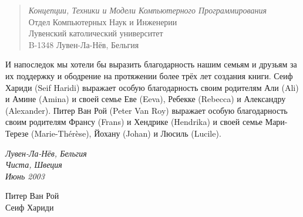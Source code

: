 \begin{quote}
\emph{Концепции, Техники и Модели Компьютерного Программирования} \\ Отдел Компьютерных Наук и Инженерии \\ Лувенский католический университет \\ B-1348 Лувен-Ла-Нёв, Бельгия
\end{quote}

И напоследок мы хотели бы выразить благодарность нашим семьям и друзьям за их поддержку и ободрение на протяжении более трёх лет создания книги. Сеиф Хариди (Seif Haridi) выражает особую благодарность своим родителям Али (Ali) и Амине (Amina) и своей семье Еве (Eeva), Ребекке (Rebecca) и Александру (Alexander). Питер Ван Рой (Peter Van Roy) выражает особую благодарность своим родителям Франсу (Frans) и Хендрике (Hendrika) и своей семье Мари-Терезе (Marie-Th{\'e}r{\`e}se), Йохану (Johan) и Люсиль (Lucile).

\hfill

\begin{minipage}{0.5\textwidth}
  \begin{flushleft}
\emph{Лувен-Ла-Нёв, Бельгия} \\ \emph{Чиста, Швеция} \\ \emph{Июнь 2003}
  \end{flushleft}
\end{minipage}
\begin{minipage}{0.4\textwidth}
  \begin{flushright}
{\large Питер Ван Рой} \\ {\large Сеиф Хариди}
  \end{flushright}
\end{minipage}






